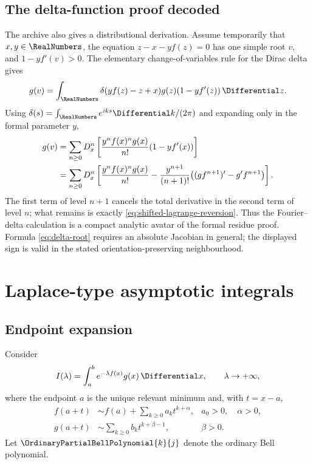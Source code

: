 \documentclass[11pt,a4paper,oneside,openany]{book}
\theoremstyle{definition}
\theoremstyle{remark}
\begin{document}
\section{The delta-function proof decoded}
The archive also gives a distributional derivation.  Assume temporarily that
$x,y\in\RealNumbers$, the equation $z-x-yf(z)=0$ has one simple root $v$, and
$1-yf'(v)>0$.  The elementary change-of-variables rule for the Dirac delta gives
\begin{equation}\label{eq:delta-root}
 g(v)=\int_{\RealNumbers}\delta(yf(z)-z+x)g(z)(1-yf'(z))\,\Differential z.
\end{equation}
Using
$\delta(s)=\int_{\RealNumbers}e^{iks}\Differential k/(2\pi)$ and expanding only in the formal
parameter $y$,
\begin{align}
 g(v)
 &=\sum_{n\ge0}D_x^n\left[
 \frac{y^nf(x)^ng(x)}{n!}(1-yf'(x))\right]\notag\\
 &=\sum_{n\ge0}D_x^n\left[
 \frac{y^nf(x)^ng(x)}{n!}
 -\frac{y^{n+1}}{(n+1)!}\bigl((gf^{n+1})'-g'f^{n+1}\bigr)
 \right].
 \label{eq:delta-reversion-middle}
\end{align}
The first term of level $n+1$ cancels the total derivative in the second term of
level $n$; what remains is exactly
\eqref{eq:shifted-lagrange-reversion}.  Thus the Fourier--delta calculation is a
compact analytic avatar of the formal residue proof.  Formula
\eqref{eq:delta-root} requires an absolute Jacobian in general; the displayed sign
is valid in the stated orientation-preserving neighbourhood.

\chapter{Laplace-type asymptotic integrals}

\section{Endpoint expansion}
Consider
\begin{equation}\label{eq:laplace-integral}
 I(\lambda)=\int_a^b e^{-\lambda f(x)}g(x)\,\Differential x,
 \qquad \lambda\to+\infty,
\end{equation}
where the endpoint $a$ is the unique relevant minimum and, with $t=x-a$,
\begin{align}
 f(a+t)&\sim f(a)+\sum_{k\ge0}a_kt^{k+\alpha},
 &a_0>0,\quad\alpha>0,
 \label{eq:laplace-f-expansion}\\
 g(a+t)&\sim\sum_{k\ge0}b_kt^{k+\beta-1},
 &\beta>0.
 \label{eq:laplace-g-expansion}
\end{align}
Let $\OrdinaryPartialBellPolynomial{k}{j}$ denote the ordinary Bell polynomial.
\end{document}
